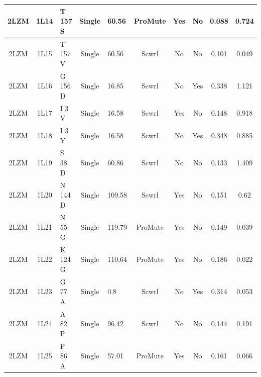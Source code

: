 \documentclass[sigconf]{acmart}
\begin{document}
\begin{table}[]
{\begin{tabular}{|c|c|p{2.8cm}|c|p{2.8cm}|c|c|c|c|c|}
		2LZM & 1L14 & T 157 S & Single & 60.56 & ProMute & Yes & No & 0.088 & 0.724 \\ \hline
		2LZM & 1L15 & T 157 V & Single & 60.56 & Scwrl & No & No & 0.101 & 0.049 \\ \hline
		2LZM & 1L16 & G 156 D & Single & 16.85 & Scwrl & No & Yes & 0.338 & 1.121 \\ \hline
		2LZM & 1L17 & I 3 V & Single & 16.58 & Scwrl & Yes & No & 0.148 & 0.918 \\ \hline
		2LZM & 1L18 & I 3 Y & Single & 16.58 & Scwrl & No & Yes & 0.348 & 0.885 \\ \hline
		2LZM & 1L19 & S 38 D & Single & 60.86 & Scwrl & No & No & 0.133 & 1.409 \\ \hline
		2LZM & 1L20 & N 144 D & Single & 109.58 & Scwrl & Yes & No & 0.151 & 0.62 \\ \hline
		2LZM & 1L21 & N 55 G & Single & 119.79 & ProMute & Yes & No & 0.149 & 0.039 \\ \hline
		2LZM & 1L22 & K 124 G & Single & 110.64 & ProMute & Yes & No & 0.186 & 0.022 \\ \hline
		2LZM & 1L23 & G 77 A & Single & 0.8 & Scwrl & No & Yes & 0.314 & 0.053 \\ \hline
		2LZM & 1L24 & A 82 P & Single & 96.42 & Scwrl & No & No & 0.144 & 0.191 \\ \hline
		2LZM & 1L25 & P 86 A & Single & 57.01 & ProMute & Yes & No & 0.161 & 0.066 \\ \hline
	\end{tabular}}
\end{table}
\end{document}
